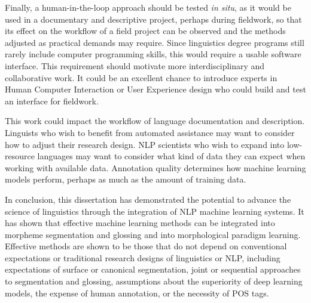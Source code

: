 Finally, a human-in-the-loop approach should be tested \textit{in situ}, as it would be used in a documentary and descriptive project, perhaps during fieldwork, so that its effect on the workflow of a field project can be observed and the methods adjusted as practical demands may require. 
Since linguistics degree programs still rarely include computer programming skills, this would require a usable software interface. This requirement should motivate more interdisciplinary and collaborative work. It could be an excellent chance to introduce experts in Human Computer Interaction or User Experience design who could build and test an interface for fieldwork.

This work could impact the workflow of language documentation and description. Linguists who wish to benefit from automated assistance may want to consider how to adjust their research design. NLP scientists who wish to expand into low-resource languages may want to consider what kind of data they can expect when working with available data. Annotation quality determines how machine learning models perform, perhaps as much as the amount of training data.

In conclusion, this dissertation has demonstrated the potential to advance the science of linguistics through the integration of NLP machine learning systems. It has shown that effective machine learning methods can be integrated into morpheme segmentation and glossing and into morphological paradigm learning. Effective methods are shown to be those that do not depend on conventional expectations or traditional research designs of linguistics or NLP, including expectations of surface or canonical segmentation, joint or sequential approaches to segmentation and glossing, assumptions about the superiority of deep learning models, the expense of human annotation, or the necessity of POS tags. 




